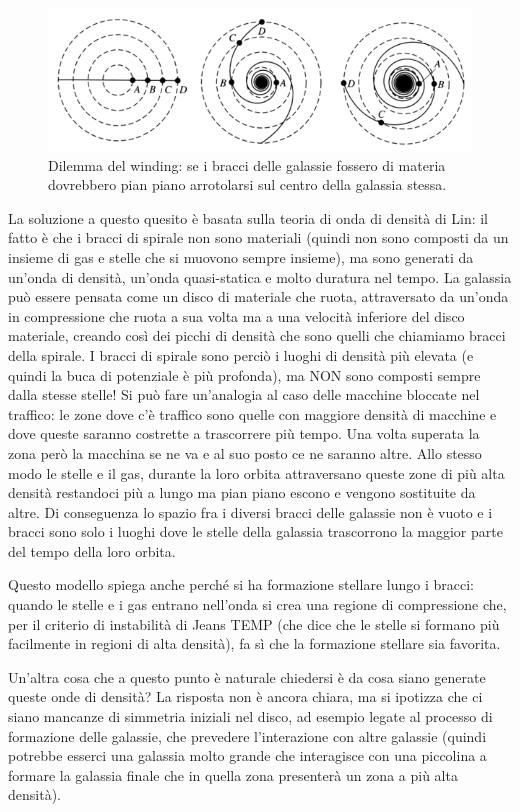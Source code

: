 \begin{figure}
    \centering
    \includegraphics{immagini/winding-dilemma.png}
    \caption[width =\textwidth]{Dilemma del winding: se i bracci delle galassie fossero di materia dovrebbero pian piano arrotolarsi sul centro della galassia stessa.}
    \label{fig:winding-dilemma}
\end{figure}

La soluzione a questo quesito è basata sulla teoria di onda di densità di Lin: il fatto è che i bracci di spirale non sono materiali (quindi non sono composti da un insieme di gas e stelle che si muovono sempre insieme), ma sono generati da un’onda di densità, un’onda quasi-statica e molto duratura nel tempo. La galassia può essere pensata come un disco di materiale che ruota, attraversato da un’onda in compressione che ruota a sua volta ma a una velocità inferiore del disco materiale, creando così dei picchi di densità che sono quelli che chiamiamo bracci della spirale. I bracci di spirale sono perciò i luoghi di densità più elevata (e quindi la buca di potenziale è più profonda), ma NON sono composti sempre dalla stesse stelle! Si può fare un'analogia al caso delle macchine bloccate nel traffico: le zone dove c'è traffico sono quelle con maggiore densità di macchine e dove queste saranno costrette a trascorrere più tempo. Una volta superata la zona però la macchina se ne va e al suo posto ce ne saranno altre. Allo stesso modo le stelle e il gas, durante la loro orbita attraversano queste zone di più alta densità restandoci più a lungo ma pian piano escono e vengono sostituite da altre. Di conseguenza lo spazio fra i diversi bracci delle galassie non è vuoto e i bracci sono solo i luoghi dove le stelle della galassia trascorrono la maggior parte del tempo della loro orbita.

Questo modello spiega anche perché si ha formazione stellare lungo i bracci: quando le stelle e i gas entrano nell’onda si crea una regione di compressione che, per il criterio di instabilità di Jeans TEMP (che dice che le stelle si formano più facilmente in regioni di alta densità), fa sì che la formazione stellare sia favorita.

Un'altra cosa che a questo punto è naturale chiedersi è da cosa siano generate queste onde di densità? La risposta non è ancora chiara, ma si ipotizza che ci siano mancanze di simmetria iniziali nel disco, ad esempio legate al processo di formazione delle galassie, che prevedere l’interazione con altre galassie (quindi potrebbe esserci una galassia molto grande che interagisce con una piccolina a formare la galassia finale che in quella zona presenterà un zona a più alta densità).
